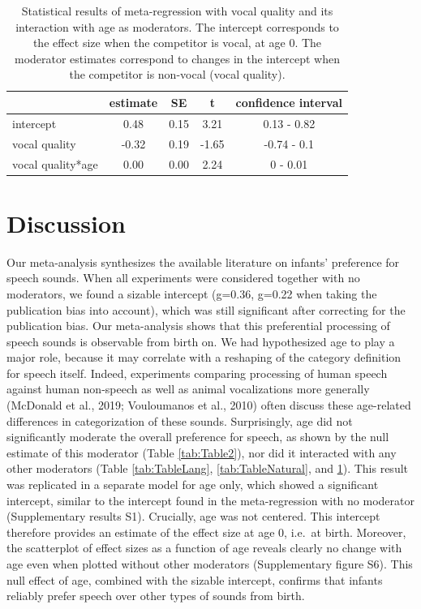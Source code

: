 \documentclass[
  man]{apa6}
\begin{document}
\begin{table}[tbp]
\begin{center}
\begin{threeparttable}
\caption{\label{tab:TableVocal}Statistical results of meta-regression with vocal quality and its interaction with age as moderators. The intercept corresponds to the effect size when the competitor is vocal, at age 0. The moderator estimates correspond to changes in the intercept when the competitor is non-vocal (vocal quality).}
\begin{tabular}{lcccc}
\toprule
 & estimate & SE & t & confidence interval\\
\midrule
intercept & 0.48 & 0.15 & 3.21 & 0.13 - 0.82\\
vocal quality & -0.32 & 0.19 & -1.65 & -0.74 - 0.1\\
vocal quality*age & 0.00 & 0.00 & 2.24 & 0 - 0.01\\
\bottomrule
\end{tabular}
\end{threeparttable}
\end{center}
\end{table}

\hypertarget{discussion}{%
\section{Discussion}\label{discussion}}

Our meta-analysis synthesizes the available literature on infants' preference for speech sounds. When all experiments were considered together with no moderators, we found a sizable intercept (g=0.36, g=0.22 when taking the publication bias into account), which was still significant after correcting for the publication bias. Our meta-analysis shows that this preferential processing of speech sounds is observable from birth on. We had hypothesized age to play a major role, because it may correlate with a reshaping of the category definition for speech itself. Indeed, experiments comparing processing of human speech against human non-speech as well as animal vocalizations more generally (McDonald et al., 2019; Vouloumanos et al., 2010) often discuss these age-related differences in categorization of these sounds. Surprisingly, age did not significantly moderate the overall preference for speech, as shown by the null estimate of this moderator (Table \ref{tab:Table2}), nor did it interacted with any other moderators (Table \ref{tab:TableLang}, \ref{tab:TableNatural}, and \ref{tab:TableVocal}). This result was replicated in a separate model for age only, which showed a significant intercept, similar to the intercept found in the meta-regression with no moderator (Supplementary results S1). Crucially, age was not centered. This intercept therefore provides an estimate of the effect size at age 0, i.e.~at birth. Moreover, the scatterplot of effect sizes as a function of age reveals clearly no change with age even when plotted without other moderators (Supplementary figure S6). This null effect of age, combined with the sizable intercept, confirms that infants reliably prefer speech over other types of sounds from birth.
\end{document}
